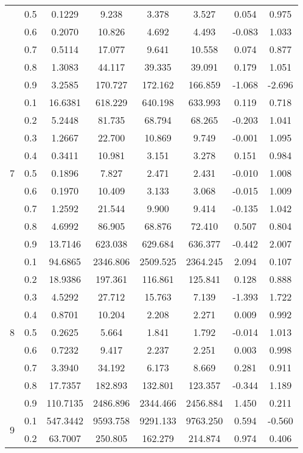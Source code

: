 \documentclass[11pt,a4paper]{report}
\begin{document}
\begin{longtable}{ | c | c || c | c | c | c | c | c | }
 & 0.5 & 0.1229 & 9.238 & 3.378 & 3.527 & 0.054 & 0.975 \\
 & 0.6 & 0.2070 & 10.826 & 4.692 & 4.493 & -0.083 & 1.033 \\
 & 0.7 & 0.5114 & 17.077 & 9.641 & 10.558 & 0.074 & 0.877 \\
 & 0.8 & 1.3083 & 44.117 & 39.335 & 39.091 & 0.179 & 1.051 \\
 & 0.9 & 3.2585 & 170.727 & 172.162 & 166.859 & -1.068 & -2.696 \\
 \hline
\multirow{9}{*}{7} & 0.1 & 16.6381 & 618.229 & 640.198 & 633.993 & 0.119 & 0.718 \\
 & 0.2 & 5.2448 & 81.735 & 68.794 & 68.265 & -0.203 & 1.041 \\
 & 0.3 & 1.2667 & 22.700 & 10.869 & 9.749 & -0.001 & 1.095 \\
 & 0.4 & 0.3411 & 10.981 & 3.151 & 3.278 & 0.151 & 0.984 \\
 & 0.5 & 0.1896 & 7.827 & 2.471 & 2.431 & -0.010 & 1.008 \\
 & 0.6 & 0.1970 & 10.409 & 3.133 & 3.068 & -0.015 & 1.009 \\
 & 0.7 & 1.2592 & 21.544 & 9.900 & 9.414 & -0.135 & 1.042 \\
 & 0.8 & 4.6992 & 86.905 & 68.876 & 72.410 & 0.507 & 0.804 \\
 & 0.9 & 13.7146 & 623.038 & 629.684 & 636.377 & -0.442 & 2.007 \\
 \hline
\multirow{9}{*}{8} & 0.1 & 94.6865 & 2346.806 & 2509.525 & 2364.245 & 2.094 & 0.107 \\
 & 0.2 & 18.9386 & 197.361 & 116.861 & 125.841 & 0.128 & 0.888 \\
 & 0.3 & 4.5292 & 27.712 & 15.763 & 7.139 & -1.393 & 1.722 \\
 & 0.4 & 0.8701 & 10.204 & 2.208 & 2.271 & 0.009 & 0.992 \\
 & 0.5 & 0.2625 & 5.664 & 1.841 & 1.792 & -0.014 & 1.013 \\
 & 0.6 & 0.7232 & 9.417 & 2.237 & 2.251 & 0.003 & 0.998 \\
 & 0.7 & 3.3940 & 34.192 & 6.173 & 8.669 & 0.281 & 0.911 \\
 & 0.8 & 17.7357 & 182.893 & 132.801 & 123.357 & -0.344 & 1.189 \\
 & 0.9 & 110.7135 & 2486.896 & 2344.466 & 2456.884 & 1.450 & 0.211 \\
 \hline
\multirow{9}{*}{9} & 0.1 & 547.3442 & 9593.758 & 9291.133 & 9763.250 & 0.594 & -0.560 \\
 & 0.2 & 63.7007 & 250.805 & 162.279 & 214.874 & 0.974 & 0.406 \\

\end{longtable}
\end{document}
